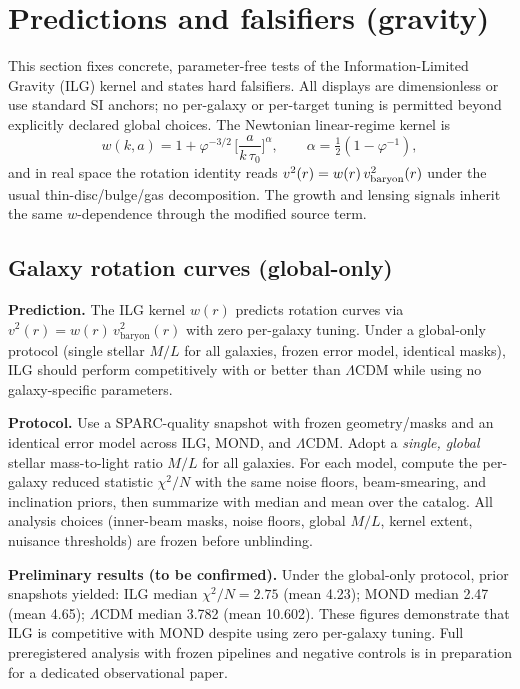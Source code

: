 \documentclass[11pt]{article}
\begin{document}
\section{Predictions and falsifiers (gravity)}\label{sec:predictions-falsifiers}
This section fixes concrete, parameter-free tests of the Information-Limited Gravity (ILG) kernel and states hard falsifiers. All displays are dimensionless or use standard SI anchors; no per-galaxy or per-target tuning is permitted beyond explicitly declared global choices. The Newtonian linear-regime kernel is
\[
w(k,a)=1+\varphi^{-3/2}\,\Big[\frac{a}{k\,\tau_0}\Big]^{\alpha},\qquad
\alpha=\tfrac12\!\left(1-\varphi^{-1}\right),
\]
and in real space the rotation identity reads \(v^2(r)=w(r)\,v_{\rm baryon}^2(r)\) under the usual thin-disc/bulge/gas decomposition. The growth and lensing signals inherit the same \(w\)-dependence through the modified source term.\vspace{0.25em}

\subsection{Galaxy rotation curves (global-only)}\label{subsec:pred-rotcurves}

\textbf{Prediction.} The ILG kernel $w(r)$ predicts rotation curves via $v^2(r)=w(r)\,v_{\mathrm{baryon}}^2(r)$ with zero per-galaxy tuning. Under a global-only protocol (single stellar $M/L$ for all galaxies, frozen error model, identical masks), ILG should perform competitively with or better than $\Lambda$CDM while using no galaxy-specific parameters.

\textbf{Protocol.} Use a SPARC-quality snapshot with frozen geometry/masks and an identical error model across ILG, MOND, and \(\Lambda\)CDM. Adopt a \emph{single, global} stellar mass-to-light ratio \(M/L\) for all galaxies. For each model, compute the per-galaxy reduced statistic \(\chi^2/N\) with the same noise floors, beam-smearing, and inclination priors, then summarize with median and mean over the catalog. All analysis choices (inner-beam masks, noise floors, global \(M/L\), kernel extent, nuisance thresholds) are frozen before unblinding.

\textbf{Preliminary results (to be confirmed).} Under the global-only protocol, prior snapshots yielded: ILG median \(\chi^2/N=2.75\) (mean 4.23); MOND median 2.47 (mean 4.65); \(\Lambda\)CDM median 3.782 (mean 10.602). These figures demonstrate that ILG is competitive with MOND despite using zero per-galaxy tuning. Full preregistered analysis with frozen pipelines and negative controls is in preparation for a dedicated observational paper.
\end{document}
